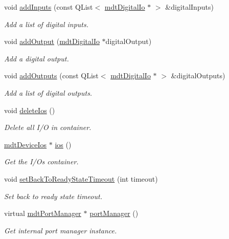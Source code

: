 \begin{DoxyCompactItemize}
void \hyperlink{classmdt_device_a9dbe6a03ca719a17f615cd59ce1fd46d}{add\-Inputs} (const Q\-List$<$ \hyperlink{classmdt_digital_io}{mdt\-Digital\-Io} $\ast$ $>$ \&digital\-Inputs)
\begin{DoxyCompactList}\small\item\em Add a list of digital inputs. \end{DoxyCompactList}\item 
void \hyperlink{classmdt_device_a319cd0eeec028f3fc8cfcb96def79404}{add\-Output} (\hyperlink{classmdt_digital_io}{mdt\-Digital\-Io} $\ast$digital\-Output)
\begin{DoxyCompactList}\small\item\em Add a digital output. \end{DoxyCompactList}\item 
void \hyperlink{classmdt_device_a3af87ab29bdd44019af739398a6987eb}{add\-Outputs} (const Q\-List$<$ \hyperlink{classmdt_digital_io}{mdt\-Digital\-Io} $\ast$ $>$ \&digital\-Outputs)
\begin{DoxyCompactList}\small\item\em Add a list of digital outputs. \end{DoxyCompactList}\item 
void \hyperlink{classmdt_device_a61032f15e601eb1bd74da80014bae593}{delete\-Ios} ()
\begin{DoxyCompactList}\small\item\em Delete all I/\-O in container. \end{DoxyCompactList}\item 
\hyperlink{classmdt_device_ios}{mdt\-Device\-Ios} $\ast$ \hyperlink{classmdt_device_adb7099877ad2080961fae5a40117e9e5}{ios} ()
\begin{DoxyCompactList}\small\item\em Get the I/\-Os container. \end{DoxyCompactList}\item 
void \hyperlink{classmdt_device_aa241c40514683254990e742cf1bbb155}{set\-Back\-To\-Ready\-State\-Timeout} (int timeout)
\begin{DoxyCompactList}\small\item\em Set back to ready state timeout. \end{DoxyCompactList}\item 
virtual \hyperlink{classmdt_port_manager}{mdt\-Port\-Manager} $\ast$ \hyperlink{classmdt_device_a06d9178b4133fd7b23084e712af20976}{port\-Manager} ()
\begin{DoxyCompactList}\small\item\em Get internal port manager instance. \end{DoxyCompactList}\item 

\end{DoxyCompactItemize}
